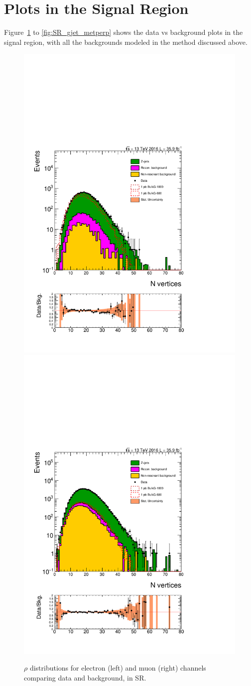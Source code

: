 \section{Plots in the Signal Region}
Figure~\ref{fig:SR_gjet_rho} to \ref{fig:SR_gjet_metperp} shows the data vs background plots in the signal region, with all the backgrounds modeled in the method discussed above. 
\begin{figure}[htbp!]
\centering
\includegraphics[width=0.46\linewidth, page=1]{figures/ReMiniSummer16_DT_PhReMiniMCRcFixXsec_GMCPhPtWt_SRdPhiGT0p5_puWeightsummer16_muoneg_gjet_metfilter_unblind_el_log_1pb.pdf}
\includegraphics[width=0.46\linewidth, page=1]{figures/ReMiniSummer16_DT_PhReMiniMCRcFixXsec_GMCPhPtWt_SRdPhiGT0p5_puWeightsummer16_muoneg_gjet_metfilter_unblind_mu_log_1pb.pdf}
\caption{$\rho$ distributions for electron (left) and muon (right) channels
comparing data and background, in SR.}
\label{fig:SR_gjet_rho}
\end{figure}


